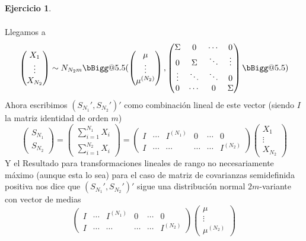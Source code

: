 \documentclass[12pt,spanish]{article}
\makeatletter
\newcommand{\VAST}{\bBigg@{5.5}}
\theoremstyle{definition}
\newtheorem{exercise}{Ejercicio}
\makeatother
\begin{document}
\begin{exercise}
\begin{enumerate}[a)]
\begin{align*}
  \end{align*} Llegamos a \[\begin{pmatrix}
      X_1 \\ \vdots \\ X_{N_2}
    \end{pmatrix}\sim N_{N_2 m}\VAST(\begin{pmatrix}
      \mu \\ \vdots \\ \mu^{(N_2)}
    \end{pmatrix},\begin{pmatrix}
      \Sigma & 0 & \cdots & 0 \\
      0 & \Sigma & \ddots & \vdots \\
      \vdots & \ddots & \ddots & 0\\
      0 & \cdots & 0 & \Sigma
    \end{pmatrix}\VAST)\]
  Ahora escribimos $(S_{N_1}',S_{N_2}')'$ como
  combinación lineal de este vector (siendo $I$ la matriz identidad de orden $m$)
  \[
    \begin{pmatrix} S_{N_1} \\ S_{N_2}
    \end{pmatrix}=
    \begin{pmatrix}
      \sum_{i=1}^{N_1}X_i \\ \sum_{i=1}^{N_2}X_i
    \end{pmatrix}=
    \begin{pmatrix}
      I & \cdots & I^{(N_1)} & 0 & \cdots & 0 \\
      I & \cdots & \cdots & \cdots & \cdots & I^{(N_2)}
    \end{pmatrix}
    \begin{pmatrix}
      X_1 \\ \vdots \\ X_{N_2}
    \end{pmatrix}
  \] Y el Resultado para transformaciones lineales de rango no
  necesariamente máximo (aunque esta lo sea) para el caso de matriz de
  covarianzas semidefinida positiva nos dice que
  $(S_{N_1}',S_{N_2}')'$ sigue una distribución normal $2m$-variante
  con vector de medias
  \[\begin{pmatrix}
      I & \cdots & I^{(N_1)} & 0 & \cdots & 0 \\
      I & \cdots & \cdots & \cdots & \cdots & I^{(N_2)}
    \end{pmatrix}\begin{pmatrix}
      \mu \\ \vdots \\ \mu^{(N_2)}

\end{pmatrix}\]
\end{enumerate}
\end{exercise}
\end{document}
